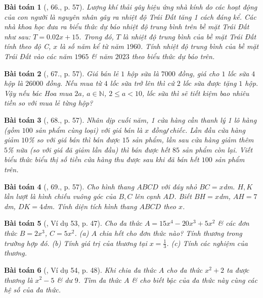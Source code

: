 \documentclass{article}
\newtheorem{baitoan}{Bài toán}
\begin{document}
\begin{baitoan}[\cite{SBT_Toan_7_Canh_Dieu_tap_2}, 66., p. 57]
	Lượng khí thải gây hiệu ứng nhà kính do các hoạt động của con người là nguyên nhân gây ra nhiệt độ Trái Đất tăng 1 cách đáng kể. Các nhà khoa học đưa ra biểu thức dự báo nhiệt độ trung bình trên bề mặt Trái Đất như sau: $T = 0.02x + 15$. Trong đó, $T$ là nhiệt độ trung bình của bề mặt Trái Đất tính theo độ \emph{C}, $x$ là số năm kể từ năm $1960$. Tính nhiệt độ trung bình của bề mặt Trái Đất vào các năm $1965$ \& năm $2023$ theo biểu thức dự báo trên.
\end{baitoan}

\begin{baitoan}[\cite{SBT_Toan_7_Canh_Dieu_tap_2}, 67., p. 57]
	Giá bán lẻ $1$ hộp sữa là $7000$ đồng, giá cho $1$ lốc sữa $4$ hộp là $26000$ đồng. Nếu mua từ $4$ lốc sữa trở lên thì cứ $2$ lốc sữa được tặng $1$ hộp. Vậy nếu bác Hoa mua $2a$, $a\in\mathbb{N}$, $2\le a < 10$, lốc sữa thì sẽ tiết kiệm bao nhiêu tiền so với mua lẻ từng hộp?
\end{baitoan}

\begin{baitoan}[\cite{SBT_Toan_7_Canh_Dieu_tap_2}, 68., p. 57]
	Nhân dịp cuối năm, 1 cửa hàng cần thanh lý 1 lô hàng (gồm $100$ sản phẩm cùng loại) với giá bán là $x$ \emph{đồng\texttt{/}chiếc}. Lần đầu cửa hàng giảm $10$\% so với giá bán thì bán được $15$ sản phẩm, lần sau cửa hàng giảm thêm $5$\% nữa (so với giá đã giảm lần đầu) thì bán được hết $85$ sản phẩm còn lại. Viết biểu thức biểu thị số tiền cửa hàng thu được sau khi đã bán hết $100$ sản phẩm trên.
\end{baitoan}

\begin{baitoan}[\cite{SBT_Toan_7_Canh_Dieu_tap_2}, 69., p. 57]
	Cho hình thang $ABCD$ với đáy nhỏ $BC = x$\emph{dm}. $H,K$ lần lượt là hình chiếu vuông góc của $B,C$ lên cạnh $AD$. Biết $BH = x$\emph{dm}, $AH = 7$\emph{dm}, $DK = 4$\emph{dm}. Tính diện tích hình thang $ABCD$ theo $x$.
\end{baitoan}

\begin{baitoan}[\cite{Tuyen_Toan_7}, Ví dụ 53, p. 47]
	Cho đa thức $A = 15x^4 - 20x^3 + 5x^2$ \& các đơn thức $B = 2x^3$, $C = 5x^2$. (a) $A$ chia hết cho đơn thức nào? Tính thương trong trường hợp đó. (b) Tính giá trị của thương tại $x = \frac{1}{3}$. (c) Tính các nghiệm của thương.
\end{baitoan}

\begin{baitoan}[\cite{Tuyen_Toan_7}, Ví dụ 54, p. 48]
	Khi chia đa thức $A$ cho đa thức $x^2 + 2$ ta được thương là $x^2 - 5$ \& dư $9$. Tìm đa thức $A$ \& cho biết bậc của đa thức này cùng các hệ số của đa thức.
\end{baitoan}
\end{document}
